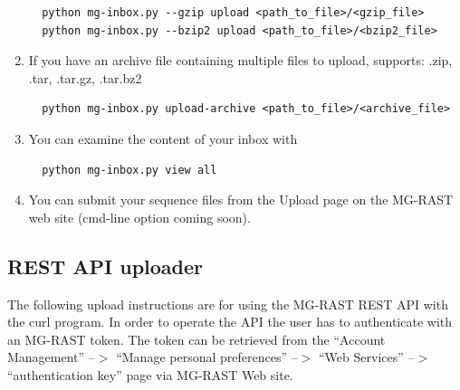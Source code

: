 \documentclass[12pt,fullpage]{report}
\begin{document}
\begin{enumerate}
\begin{small}
\begin{lstlisting}
  python mg-inbox.py --gzip upload <path_to_file>/<gzip_file>
  python mg-inbox.py --bzip2 upload <path_to_file>/<bzip2_file>
\end{lstlisting}
\end{small}
\item If you have an archive file containing multiple files to upload, supports: .zip, .tar, .tar.gz, .tar.bz2
\begin{small}
\begin{lstlisting}
  python mg-inbox.py upload-archive <path_to_file>/<archive_file>
\end{lstlisting}
\end{small}
\item You can examine the content of your inbox with
\begin{small}
\begin{lstlisting}
  python mg-inbox.py view all
\end{lstlisting}
\end{small}
\item You can submit your sequence files from the Upload page on the MG-RAST web site (cmd-line option coming soon).
\end{enumerate}

\subsection{REST API uploader}

The following upload instructions are for using the MG-RAST REST API with the curl program. In order to operate the API the user has to authenticate with an MG-RAST token. The token can be retrieved from the “Account Management” --$>$ “Manage personal preferences” --$>$ “Web Services” --$>$ “authentication key” page via MG-RAST Web site.
\end{document}
